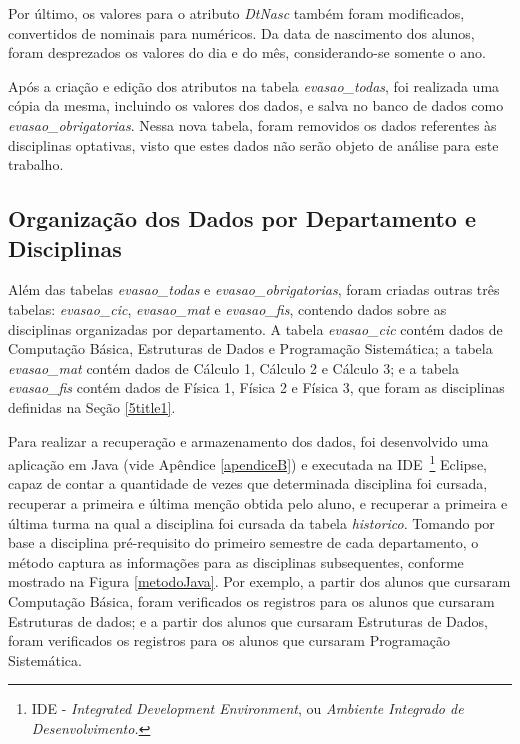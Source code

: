 	Por último, os valores para o atributo \textit{DtNasc} também foram modificados, convertidos de nominais para numéricos. Da data de nascimento dos alunos, foram desprezados os valores do dia e do mês, considerando-se somente o ano.
	
	Após a criação e edição dos atributos na tabela \textit{evasao\_todas}, foi realizada uma cópia da mesma, incluindo os valores dos dados, e salva no banco de dados como \textit{evasao\_obrigatorias}. Nessa nova tabela, foram removidos os dados referentes às disciplinas optativas, visto que estes dados não serão objeto de análise para este trabalho.    
	
	\subsection{Organização dos Dados por Departamento e Disciplinas} \label{5subsubtitle1}
	
	Além das tabelas \textit{evasao\_todas} e \textit{evasao\_obrigatorias}, foram criadas outras três tabelas: \textit{evasao\_cic}, \textit{evasao\_mat} e \textit{evasao\_fis}, contendo dados sobre as disciplinas organizadas por departamento. A tabela \textit{evasao\_cic} contém dados de Computação Básica, Estruturas de Dados e Programação Sistemática; a tabela \textit{evasao\_mat} contém dados de Cálculo 1, Cálculo 2 e Cálculo 3; e  a tabela \textit{evasao\_fis} contém dados de Física 1, Física 2 e Física 3, que foram as disciplinas definidas na Seção \ref{5title1}.  
	
	Para realizar a recuperação e armazenamento dos dados, foi desenvolvido uma aplicação em Java (vide Apêndice \ref{apendiceB}) e executada na IDE~\footnote{IDE - \textit{Integrated Development Environment}, ou \textit{Ambiente Integrado de Desenvolvimento.}} Eclipse, capaz de contar a quantidade de vezes que determinada disciplina foi cursada, recuperar a primeira e última menção obtida pelo aluno, e recuperar a primeira e última turma na qual a disciplina foi cursada da tabela \textit{historico}. Tomando por base a disciplina pré-requisito do primeiro semestre de cada departamento, o método captura as informações para as disciplinas subsequentes, conforme mostrado na Figura \ref{metodoJava}. Por exemplo, a partir dos alunos que cursaram Computação Básica, foram verificados os registros para os alunos que cursaram Estruturas de dados; e a partir dos alunos que cursaram Estruturas de Dados, foram verificados os registros para os alunos que cursaram Programação Sistemática. 
	
